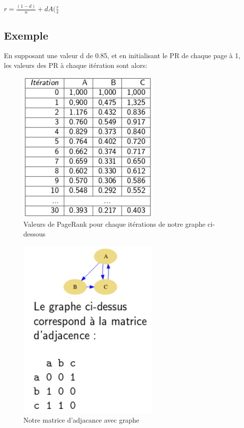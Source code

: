 \documentclass[oneside]{book}
\begin{document}
\centering
$r = \frac{(1-d)}{n} + dA(\frac{r}{s}$
\justify
 
 
\subsection{Exemple}
En supposant une valeur d de 0.85, et en initialisant le PR de chaque page à 1, les valeurs des PR à chaque itération sont alors:

\begin{figure}[!ht]
\centering
\includegraphics[width = 7cm]{pagerank_scores.png}
\caption{Valeurs de PageRank pour chaque itérations de notre graphe ci-dessous}
\label{fig:valeurs_pagerank_iterations}
\end{figure}

\begin{figure}[!ht]
\centering
\includegraphics[width = 7cm]{matrice_adjacance.png}
\caption{Notre matrice d'adjacance avec graphe}
\label{fig:matrice_adjacance}
\end{figure}
\end{document}

